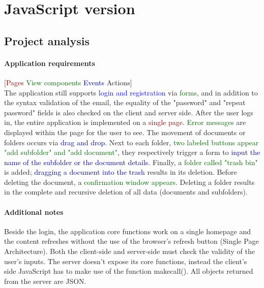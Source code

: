 \documentclass[a4paper,12pt]{article}
\begin{document}
\newpage

\section{JavaScript version}
\subsection{Project analysis}
\paragraph{Application requirements}
[\textcolor{darkred}{Pages} \textcolor{darkgreen}{View components} \textcolor{darkblue}{Events} \textcolor{darkyellow}{Actions}]\\
The application still supports \textcolor{blue}{login and registration} via \textcolor{darkgreen}{forms}, and in addition to the \textcolor{darkyellow}{syntax validation of the email}, the \textcolor{darkyellow}{equality of the "password" and "repeat password" fields is also checked} on the client and server side. After the user logs in, the entire application is implemented on a \textcolor{darkred}{single page}. \textcolor{darkgreen}{Error messages} are displayed within the page for the user to see. The \textcolor{darkyellow}{movement of documents or folders} occurs via \textcolor{darkblue}{drag and drop}. Next to each folder, \textcolor{darkgreen}{two labeled buttons appear "add subfolder" and "add document"}, they respectively \textcolor{darkyellow}{trigger a form} to \textcolor{darkblue}{input the name of the subfolder or the document details}. Finally, a \textcolor{darkgreen}{folder called "trash bin"} is added; \textcolor{darkblue}{dragging a document into the trash} results in \textcolor{darkyellow}{its deletion}. Before deleting the document, a \textcolor{darkgreen}{confirmation window appears}. \textcolor{darkyellow}{Deleting a folder results in the complete and recursive deletion of all data (documents and subfolders)}.

\paragraph{Additional notes}
Beside the login, the application core functions work on a single homepage and the content refreshes without the use of the browser's refresh button (Single Page Architecture). Both the client-side and server-side must check the validity of the user's inputs. The server doesn't expose its core functions, instead the client's side JavaScript has to make use of the function makecall(). All objects returned from the server are JSON. 
\newpage
\end{document}
